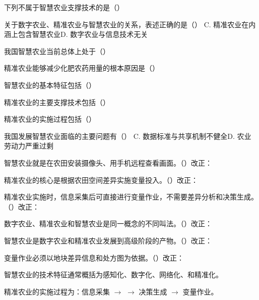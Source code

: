 \documentclass[a4paper,11pt]{article}
\begin{document}
\q 下列不属于智慧农业支撑技术的是（\quad）

\q 关于数字农业、精准农业与智慧农业的关系，表述正确的是（\quad）
{C. 精准农业在内涵上包含智慧农业}{D. 数字农业与信息技术无关}

\q 我国智慧农业当前总体上处于（\quad）

\q 精准农业能够减少化肥农药用量的根本原因是（\quad）

\q 智慧农业的基本特征包括（\quad）

\q 精准农业的主要支撑技术包括（\quad）

\q 精准农业的实施过程包括（\quad）

\q 我国发展智慧农业面临的主要问题有（\quad）
{C. 数据标准与共享机制不健全}{D. 农业劳动力严重过剩}

\q 智慧农业就是在农田安装摄像头、用手机远程查看画面。\quad（\quad）\quad 改正：\fixblank

\q 精准农业的核心是根据农田空间差异实施变量投入。\quad（\quad）\quad 改正：\fixblank

\q 精准农业实施时，信息采集后可直接进行变量作业，不需要差异分析和决策生成。\quad（\quad）\quad 改正：\fixblank

\q 数字农业、精准农业和智慧农业是同一概念的不同叫法。\quad（\quad）\quad 改正：\fixblank

\q 智慧农业是数字农业和精准农业发展到高级阶段的产物。\quad（\quad）\quad 改正：\fixblank

\q 变量作业必须以地块差异信息和处方图为依据。\quad（\quad）\quad 改正：\fixblank

\q 智慧农业的技术特征通常概括为感知化、数字化、网络化、\fillblanks[2.0cm]和精准化。

\q 精准农业的实施过程为：信息采集 $\rightarrow$ \fillblanks[2.2cm] $\rightarrow$ 决策生成 $\rightarrow$ 变量作业。
\end{document}

